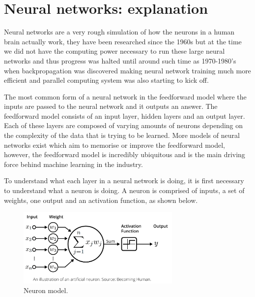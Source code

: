 \documentclass[a4paper,oneside,phd,etd]{BYUPhys}
\begin{document}
\section{Neural networks: explanation}
Neural networks are a very rough simulation of how the neurons in a human brain actually work\cite{neural-network-intro}, they have been researched since the 1960s\cite{neural-network-history} but at the time we did not have the computing power necessary to run these large neural networks and thus progress was halted until around such time as 1970-1980's when backpropagation was discovered making neural network training much more efficient and parallel computing system was also starting to kick off.

The most common form of a neural network in the feedforward model where the inputs are passed to the neural network and it outputs an answer. The feedforward model consists of an input layer, hidden layers and an output layer. Each of these layers are composed of varying amounts of neurons depending on the complexity of the data that is trying to be learned. More models of neural networks exist which aim to memorise or improve the feedforward model, however, the feedforward model is incredibly ubiquitous and is the main driving force behind machine learning in the industry. 

To understand what each layer in a neural network is doing, it is first necessary to understand what a neuron is doing. A neuron is comprised of inputs, a set of weights, one output and an activation function\cite{neural-network-intro-book}, as shown below.
\begin{figure}[H]
\centering
\includegraphics[width=8cm]{pictures/neuron_model.png}
\caption{Neuron model\cite{fig:neuron_model}.}
\label{fig:neuron_model}
\end{figure}
\end{document}
